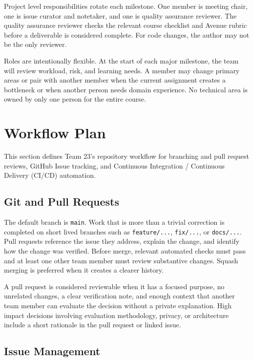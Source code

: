 \documentclass{article}
\begin{document}
Project level responsibilities rotate each milestone. One member is meeting chair, one is issue curator and notetaker, and one is quality assurance reviewer. The quality assurance reviewer checks the relevant course checklist and Avenue rubric before a deliverable is considered complete. For code changes, the author may not be the only reviewer.

Roles are intentionally flexible. At the start of each major milestone, the team will review workload, risk, and learning needs. A member may change primary areas or pair with another member when the current assignment creates a bottleneck or when another person needs domain experience. No technical area is owned by only one person for the entire course.

\section{Workflow Plan}

This section defines Team 23's repository workflow for branching and pull request reviews, GitHub Issue tracking, and Continuous Integration / Continuous Delivery (CI/CD) automation.

\subsection{Git and Pull Requests}

The default branch is \texttt{main}. Work that is more than a trivial correction is completed on short lived branches such as \texttt{feature/...}, \texttt{fix/...}, or \texttt{docs/...}. Pull requests reference the issue they address, explain the change, and identify how the change was verified. Before merge, relevant automated checks must pass and at least one other team member must review substantive changes. Squash merging is preferred when it creates a clearer history.

A pull request is considered reviewable when it has a focused purpose, no unrelated changes, a clear verification note, and enough context that another team member can evaluate the decision without a private explanation. High impact decisions involving evaluation methodology, privacy, or architecture include a short rationale in the pull request or linked issue.

\subsection{Issue Management}
\end{document}
